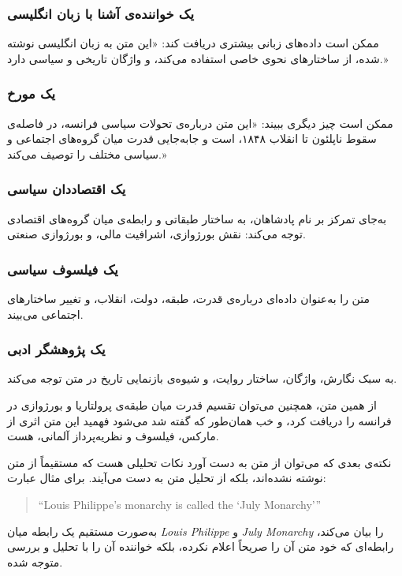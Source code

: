 \subsubsection{یک خواننده‌ی آشنا با زبان انگلیسی}
ممکن است داده‌های زبانی بیشتری دریافت کند: «این متن به زبان انگلیسی نوشته شده، از ساختارهای نحوی خاصی استفاده می‌کند، و واژگان تاریخی و سیاسی دارد.»

\subsubsection{یک مورخ}
ممکن است چیز دیگری ببیند: «این متن درباره‌ی تحولات سیاسی فرانسه، در فاصله‌ی سقوط ناپلئون تا انقلاب ۱۸۴۸، است و جابه‌جایی قدرت میان گروه‌های اجتماعی و سیاسی مختلف را توصیف می‌کند.»

\subsubsection{یک اقتصاددان سیاسی}
به‌جای تمرکز بر نام پادشاهان، به ساختار طبقاتی و رابطه‌ی میان گروه‌های اقتصادی توجه می‌کند: نقش بورژوازی، اشرافیت مالی، و بورژوازی صنعتی.

\subsubsection{یک فیلسوف سیاسی}
متن را به‌عنوان داده‌ای درباره‌ی قدرت، طبقه، دولت، انقلاب، و تغییر ساختارهای اجتماعی می‌بیند.

\subsubsection{یک پژوهشگر ادبی}
به سبک نگارش، واژگان، ساختار روایت، و شیوه‌ی بازنمایی تاریخ در متن توجه می‌کند.

از همین متن، همچنین می‌توان تقسیم قدرت میان طبقه‌ی پرولتاریا و بورژوازی در فرانسه را دریافت کرد، و خب همان‌طور که گفته شد می‌شود فهمید این متن اثری از مارکس، فیلسوف و نظریه‌پرداز آلمانی، هست.

نکته‌ی بعدی که می‌توان از متن به دست آورد نکات تحلیلی هست که مستقیماً از متن نوشته نشده‌اند، بلکه از تحلیل متن به دست می‌آیند. برای مثال عبارت:

\begin{quote}
``Louis Philippe's monarchy is called the `July Monarchy'''
\end{quote}

به‌صورت مستقیم یک رابطه میان \textit{Louis Philippe} و \textit{July Monarchy} را بیان می‌کند، رابطه‌ای که خود متن آن را صریحاً اعلام نکرده، بلکه خواننده آن را با تحلیل و بررسی متوجه شده.

